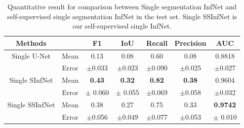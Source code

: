  \begin{table}[!ht]
 	\centering
 	\begin{tabular}{| c | c || c c c c c ||}
 		\hline
 		Methods & & F1 & IoU & Recall & Precision & AUC \\ \hline
 		Single U-Net & Mean & 0.13 & 0.08 & 0.60 & 0.08 & 0.8818 \\ \cline{2-7}
 		& Error & $\pm$0.033 & $\pm$0.023 & $\pm$0.090 & $\pm$0.025 & $\pm$0.027 \\ \hline
 		Single SInfNet &  Mean & \textbf{0.43} & \textbf{0.32} & \textbf{0.82} & \textbf{0.38} &0.9604 \\ \cline{2-7}
 		& Error & $\pm$ 0.060 & $\pm$ 0.055 & $\pm$0.069 & $\pm$0.058  & $\pm$0.032 \\ \hline
 		Single SSInfNet &  Mean & 0.38 & 0.27 & 0.75 & 0.33 & \textbf{0.9742}  \\ \cline{2-7}
 		& Error & $\pm$0.056 & $\pm$0.049 &$\pm$0.077  & $\pm$0.053 & $\pm$  0.010 \\ \hline
 	\end{tabular}
 	\caption{Quantitative result for comparison between Single segmentation InfNet and self-supervised single segmentation InfNet in the test set. Single SSInfNet is our self-supervised single InfNet.}
 	\label{tab:single}
 \end{table}


